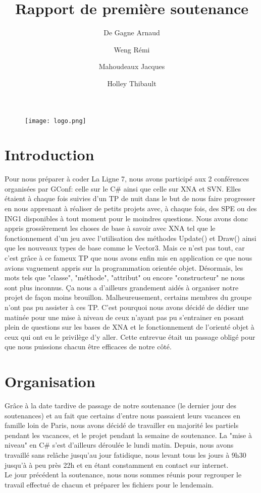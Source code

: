 \documentclass[12pt,a4paper]{article} %
\title {Rapport de première soutenance}
\author {De Gagne Arnaud\and Weng Rémi\and Mahoudeaux Jacques\and Holley Thibault}
\date {}
\begin{document}
\maketitle    
\begin{figure}[hp]
\centering
\texttt{[image: logo.png]}
\label{fig:aMAZEing escape}
\end{figure}
\pagestyle{fancy}
\renewcommand{\headrulewidth}{0.4pt}
\renewcommand{\footrulewidth}{0.4pt}
\newpage
\tableofcontents
\newpage
\section {Introduction}
Pour nous préparer à coder La Ligne 7, nous avons participé aux 2 conférences organisées par GConf: celle sur le C\# ainsi que celle sur XNA et SVN. Elles étaient à chaque fois suivies d'un TP de nuit dans le but de nous faire progresser en nous apprenant à réaliser de petits projets avec, à chaque fois, des SPE ou des ING1 disponibles à tout moment pour le moindres questions. Nous avons donc appris grossièrement les choses de base à savoir avec XNA tel que le fonctionnement d'un jeu avec l'utilisation des méthodes Update() et Draw() ainsi que les nouveaux types de base comme le Vector3. Mais ce n'est pas tout, car c'est grâce à ce fameux TP que nous avons enfin mis en application ce que nous avions vaguement appris sur la programmation orientée objet. Désormais, les mots tels que "classe", "méthode", "attribut" ou encore "constructeur" ne nous sont plus inconnus. Ça nous a d'ailleurs grandement aidés à organiser notre projet de façon moins brouillon. Malheureusement, certains membres du groupe n'ont pas pu assister à ces TP. C'est pourquoi nous avons décidé de dédier une matinée pour une mise à niveau de ceux n'ayant pas pu s'entrainer en posant plein de questions sur les bases de XNA et le fonctionnement de l'orienté objet à ceux qui ont eu le privilège d'y aller. Cette entrevue était un passage obligé pour que nous puissions chacun être efficaces de notre côté.
\section {Organisation}
Grâce à la date tardive de passage de notre soutenance (le dernier jour des soutenances) et au fait que certains d'entre nous passaient leurs vacances en famille loin de Paris, nous avons décidé de travailler en majorité les partiels pendant les vacances, et le projet pendant la semaine de soutenance. La "mise à niveau" en C\# s'est d'ailleurs déroulée le lundi matin. Depuis, nous avons travaillé sans relâche jusqu'au jour fatidique, nous levant tous les jours à 9h30 jusqu'à à peu près 22h et en étant constamment en contact sur internet.\\
Le jour précédent la soutenance, nous nous sommes réunis pour regrouper le travail effectué de chacun et préparer les fichiers pour le lendemain.
\newpage
\end{document}
